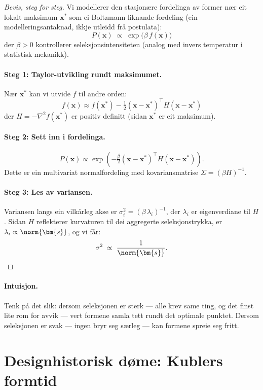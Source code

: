 \begin{proof}[Bevis, steg for steg]
Vi modellerer den stasjonære fordelinga av former nær eit
lokalt maksimum $\bm{x}^*$ som ei Boltzmann-liknande fordeling
(ein modelleringsantaknad, ikkje utleidd frå postulata):
\[
  P(\bm{x}) \;\propto\;
  \exp\!\bigl(\beta \, f(\bm{x})\bigr)
\]
der $\beta > 0$ kontrollerer seleksjonsintensiteten (analog med
invers temperatur i statistisk mekanikk).

\paragraph{Steg 1: Taylor-utvikling rundt maksimumet.}
Nær $\bm{x}^*$ kan vi utvide $f$ til andre orden:
\[
  f(\bm{x}) \approx f(\bm{x}^*)
  - \tfrac{1}{2}
  (\bm{x} - \bm{x}^*)^\top H (\bm{x} - \bm{x}^*)
\]
der $H = -\nabla^2 f(\bm{x}^*)$ er positiv definitt
(sidan $\bm{x}^*$ er eit maksimum).

\paragraph{Steg 2: Sett inn i fordelinga.}
\[
  P(\bm{x}) \propto \exp\!\left(
    -\tfrac{\beta}{2}
    (\bm{x} - \bm{x}^*)^\top H
    (\bm{x} - \bm{x}^*)
  \right).
\]
Dette er ein multivariat normalfordeling med kovariansmatrise
$\Sigma = (\beta H)^{-1}$.

\paragraph{Steg 3: Les av variansen.}
Variansen langs ein vilkårleg akse er
$\sigma_i^2 = (\beta \, \lambda_i)^{-1}$, der $\lambda_i$ er
eigenverdiane til $H$. Sidan $H$ reflekterer kurvaturen til dei
aggregerte seleksjonstrykka, er $\lambda_i \propto \norm{\bm{s}}$,
og vi får:
\[
  \sigma^2 \;\propto\; \frac{1}{\norm{\bm{s}}}. \qedhere
\]
\end{proof}

\paragraph{Intuisjon.}
Tenk på det slik: dersom seleksjonen er sterk --- alle krev same
ting, og det finst lite rom for avvik --- vert formene samla tett
rundt det optimale punktet. Dersom seleksjonen er svak --- ingen
bryr seg særleg --- kan formene spreie seg fritt.


\section{Designhistorisk døme: Kublers formtid}

